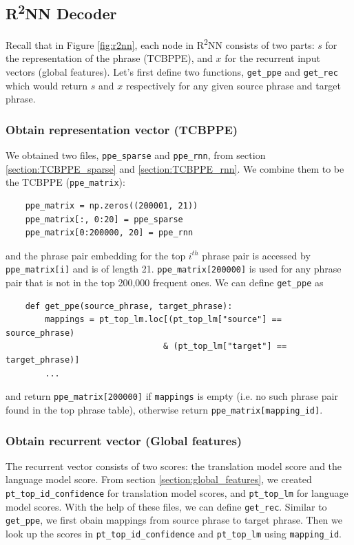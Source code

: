 \documentclass[12pt,a4paper,twoside,openright]{report}
\begin{document}
\subsection{\texorpdfstring{R\textsuperscript{2}NN}{R2NN} Decoder} \label{section:r2nn_model}
Recall that in Figure \ref{fig:r2nn}, each node in R\textsuperscript{2}NN consists of two parts: $s$ for the representation of the phrase (TCBPPE), and $x$ for the recurrent input vectors (global features). Let's first define two functions, \texttt{get\_ppe} and \texttt{get\_rec} which would return $s$ and $x$ respectively for any given source phrase and target phrase.

\subsubsection{Obtain representation vector (TCBPPE)}
We obtained two files, \texttt{ppe\_sparse} and \texttt{ppe\_rnn}, from section \ref{section:TCBPPE_sparse} and \ref{section:TCBPPE_rnn}. We combine them to be the TCBPPE (\texttt{ppe\_matrix}):

\begin{verbatim}
    ppe_matrix = np.zeros((200001, 21))
    ppe_matrix[:, 0:20] = ppe_sparse
    ppe_matrix[0:200000, 20] = ppe_rnn
\end{verbatim}

and the phrase pair embedding for the top $i^{th}$ phrase pair is accessed by \texttt{ppe\_matrix[i]} and is of length 21. \texttt{ppe\_matrix[200000]} is used for any phrase pair that is not in the top 200,000 frequent ones. We can define \texttt{get\_ppe} as

\begin{verbatim}
    def get_ppe(source_phrase, target_phrase):
        mappings = pt_top_lm.loc[(pt_top_lm["source"] == source_phrase) 
                                & (pt_top_lm["target"] == target_phrase)]
        ...
\end{verbatim}

and return \texttt{ppe\_matrix[200000]} if \texttt{mappings} is empty (i.e. no such phrase pair found in the top phrase table), otherwise return \texttt{ppe\_matrix[mapping\_id]}.

\subsubsection{Obtain recurrent vector (Global features)}
The recurrent vector consists of two scores: the translation model score and the language model score. From section \ref{section:global_features}, we created \texttt{pt\_top\_id\_confidence} for translation model scores, and \texttt{pt\_top\_lm} for language model scores. With the help of these files, we can define \texttt{get\_rec}. Similar to \texttt{get\_ppe}, we first obain mappings from source phrase to target phrase. Then we look up the scores in \texttt{pt\_top\_id\_confidence} and \texttt{pt\_top\_lm} using \texttt{mapping\_id}.
\end{document}
